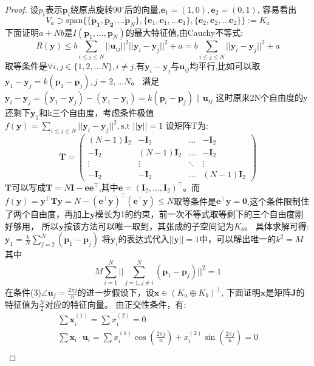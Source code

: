 \begin{proof}
设$\mathring{p}_i$表示$\bm{p}_i$绕原点旋转$90^{\circ}$后的向量,$\bm{e}_1=(1,0),\bm{e}_2=(0,1)$,
容易看出
\[
V_a \supset\text{span}\{\{\bm{\mathring{p}_1},\bm{\mathring{p}_2},...\bm{\mathring{p}} _N\},\{\bm{e}_1,\bm{e}_1,...\bm{e}_1\},\{\bm{e}_2,\bm{e}_2,...\bm{e}_2\}\}:=K_a
\]
下面证明$a+Nb$是$I(\bm{p}_1,\dots,\bm{p}_N)$的最大特征值,由Cauchy不等式:
\begin{equation}
R(\bm{y})\leq b\sum_{i\leq j\leq N} ||\bm{u}_{ij}||^2||\bm{y}_i-\bm{y}_j||^2+a=b\sum_{i\leq j\leq N}||\bm{y}_i-\bm{y}_j||^2+a
\end{equation}
取等条件是$\forall i,j\in \{1,2,...N\},i\neq j$,有$\bm{y}_i-\bm{y}_j$与$\bm{u}_{ij}$均平行,比如可以取
$\bm{y}_1-\bm{y}_j=k(\bm{p}_1-\bm{p}_j),j=2,...N$。
满足
$\bm{y}_i-\bm{y}_j=(\bm{y}_1-\bm{y}_j)-(\bm{y}_1-\bm{y}_i)
=k(\bm{p}_i-\bm{p}_j)\parallel \bm{u}_{ij}$
这时原来2N个自由度的y还剩下$\bm{y}_1$和k三个自由度，考虑条件极值
$f(\bm{y})=\sum_{i\leq j\leq N} ||\bm{y}_i-\bm{y}_j||^2,\text{s.t } ||\bm{y}||=1$
设矩阵T为:
\[
\bm{T}=\left(
\begin{array}{cccc}
(N-1)\bm{I}_2&-\bm{I}_2&\dots&-\bm{I}_2\\
-\bm{I}_2&(N-1)\bm{I}_2&\dots&-\bm{I}_2\\
\vdots & \vdots & \ddots & \vdots\\
-\bm{I}_2& -\bm{I}_2 & \dots & (N-1)\bm{I}_2
\end{array}
\right)
\]
$\bm{T}$可以写成$\bm{T}=N\bm{I}-\bm{e}\bm{e}^\intercal $,其中$\bm{e}=(\bm{I}_2,\dots,\bm{I}_2)^\intercal $。而$f(\bm{y})=\bm{y}^\intercal \bm{T}\bm{y}=N-(\bm{e}^\intercal \bm{y})^\intercal (\bm{e}^\intercal \bm{y})\leq N$取等条件是$\bm{e}^\intercal \bm{y}=\bm{0}$,这个条件限制住了两个自由度，再加上$\bm{y}$模长为1的约束，前一次不等式取等剩下的三个自由度刚好够用，
所以$\bm{y}$按该方法可以唯一取到，其张成的子空间记为$K_b$。
具体求解可得:
$\bm{y}_1=\frac{k}{N}\sum_{j=2}^N (\bm{p}_1-\bm{p}_j)$
将$\bm{y}_i$的表达式代入$||\bm{y}||=1$中，可以解出唯一的$k^2=M$
其中
\[
M\sum_{i=1}^N||\sum_{j=1,j\neq i}^N(\bm{p}_1-\bm{p}_j)||^2=1
\]
  在条件(3)$\angle\bm{u}_j=\frac{2\pi j}{n}$的进一步假设下，设$\bm{x}\in (K_a\oplus K_b)^{\bot}$,
  下面证明$\bm{x}$是矩阵$\bm{J}$的特征值为$\frac{N}{2}$对应的特征向量。
  由正交性条件，有:
\begin{eqnarray}
\sum \bm{x}_i^{(1)}=\sum x_i^{(2)}=0\\
\sum \bm{x}_i \cdot \bm{u}_i=\sum x_i^{(1)} \cos(\frac{2\pi j}{n})+x_i^{(2)} \sin(\frac{2\pi j}{n}) =0\label{eq:coupling1}\\

\end{eqnarray}
\end{proof}
